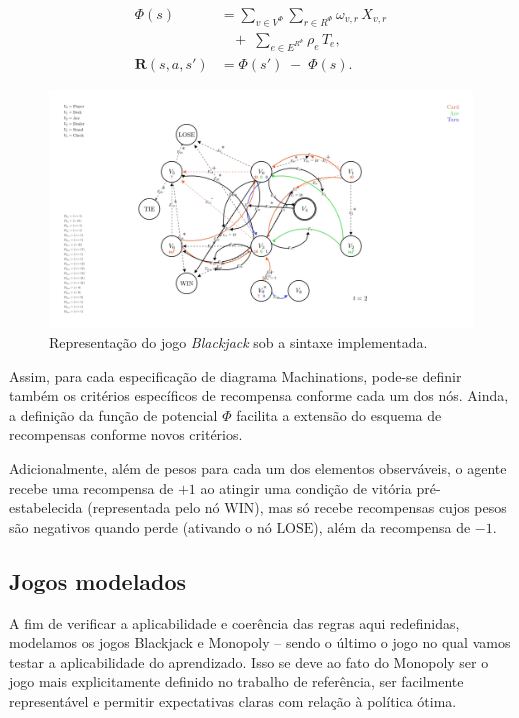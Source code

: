 \documentclass[conference]{IEEEtran}
\begin{document}
\begin{align*}
    \Phi(s) &= \sum_{v\in V^{\Phi}}\sum_{r \in R^{\Phi}}\omega_{v,r}\,X_{v,r}\\
          &\ \ \ \ +\;\sum_{e\in E^{R^{\Phi}}}\rho_{e}\,T_{e},\\
    \mathbf{R}(s,a,s') &= \Phi(s') \;-\; \Phi(s).
\end{align*}

\begin{figure}[h!]
    \centering
    \includegraphics[width=1.2\linewidth]{figures/Blackjack.png}
    \caption{Representação do jogo \textit{Blackjack} sob a sintaxe implementada.}
    \label{fig:blackjack}
\end{figure}

Assim, para cada especificação de diagrama Machinations, pode-se definir também os critérios específicos de recompensa conforme cada um dos nós. Ainda, a definição da função de potencial $\Phi$ facilita a extensão do esquema de recompensas conforme novos critérios.

Adicionalmente, além de pesos para cada um dos elementos observáveis, o agente recebe uma recompensa de $+1$ ao atingir uma condição de vitória pré-estabelecida (representada pelo nó $\text{WIN}$), mas só recebe recompensas cujos pesos são negativos quando perde (ativando o nó $\text{LOSE}$), além da recompensa de $-1$.

\subsection{Jogos modelados}
A fim de verificar a aplicabilidade e coerência das regras aqui redefinidas, modelamos os jogos Blackjack e Monopoly -- sendo o último o jogo no qual vamos testar a aplicabilidade do aprendizado. Isso se deve ao fato do Monopoly ser o jogo mais explicitamente definido no trabalho de referência\cite{machinations}, ser facilmente representável e permitir expectativas claras com relação à política ótima.
\end{document}
